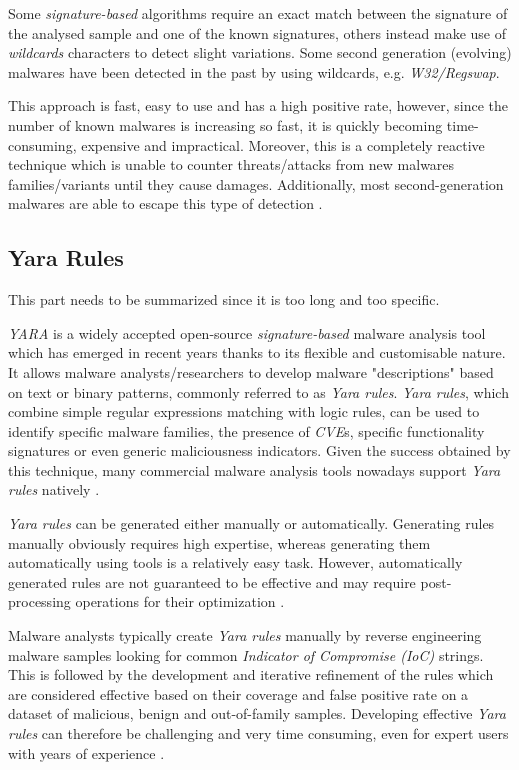 \documentclass[pdfa%
,cucitura%
]{toptesi}
\begin{document}
Some \textit{signature-based} algorithms require an exact match between the signature of the analysed sample and one of the known signatures, others instead make use of \textit{wildcards} characters to detect slight variations. Some second generation (evolving) malwares have been detected in the past by using wildcards, e.g. \textit{W32/Regswap}.

This approach is fast, easy to use and has a high positive rate, however, since the number of known malwares is increasing so fast, it is quickly becoming time-consuming, expensive and impractical. Moreover, this is a completely reactive technique which is unable to counter threats/attacks from new malwares families/variants until they cause damages. Additionally, most second-generation malwares are able to escape this type of detection \cite{Sharma_2014}.

\subsection{Yara Rules}
\color{Green}
This part needs to be summarized since it is too long and too specific.
\color{Black}

\textit{YARA} is a widely accepted open-source \textit{signature-based} malware analysis tool which has emerged in recent years thanks to its flexible and customisable nature. It allows malware analysts/researchers to develop malware "descriptions" based on text or binary patterns, commonly referred to as \textit{Yara rules}. \textit{Yara rules}, which combine simple regular expressions matching with logic rules, can be used to identify specific malware families, the presence of \textit{CVE}s, specific functionality signatures or even generic maliciousness indicators. Given the success obtained by this technique, many commercial malware analysis tools nowadays support \textit{Yara rules} natively \cite{SimonWIY}.

\textit{Yara rules} can be generated either manually or automatically. Generating rules manually obviously requires high expertise, whereas generating them automatically using tools is a relatively easy task. However, automatically generated rules are not guaranteed to be effective and may require post-processing operations for their optimization \cite{NaikEAGYRETE}.

Malware analysts typically create \textit{Yara rules} manually by reverse engineering malware samples looking for common \textit{Indicator of Compromise (IoC)} strings. This is followed by the development and iterative refinement of the rules which are considered effective based on their coverage and false positive rate on a dataset of malicious, benign and out-of-family samples. Developing effective \textit{Yara rules} can therefore be challenging and very time consuming, even for expert users with years of experience \cite{RaffAYRGUB}.
\end{document}
